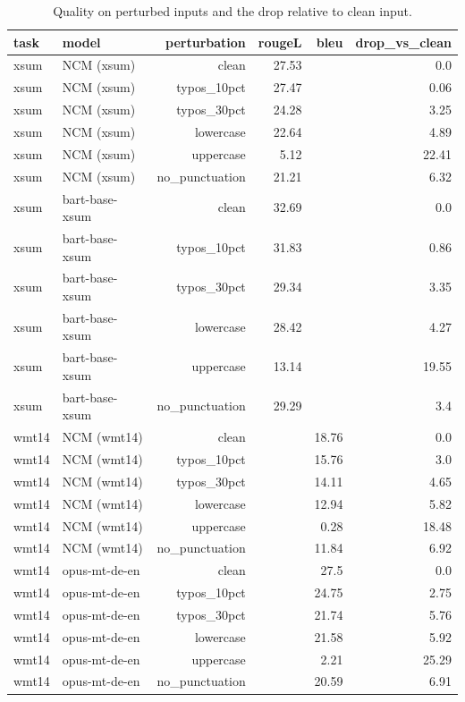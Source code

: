 \begin{table}[t]
\centering\small
\caption{Quality on perturbed inputs and the drop relative to clean input.}
\label{tab:robustness}
\begin{tabular}{llrrrr}
\toprule
task & model & perturbation & rougeL & bleu & drop\_vs\_clean \\
\midrule
xsum & NCM (xsum) & clean & 27.53 &  & 0.0 \\
xsum & NCM (xsum) & typos\_10pct & 27.47 &  & 0.06 \\
xsum & NCM (xsum) & typos\_30pct & 24.28 &  & 3.25 \\
xsum & NCM (xsum) & lowercase & 22.64 &  & 4.89 \\
xsum & NCM (xsum) & uppercase & 5.12 &  & 22.41 \\
xsum & NCM (xsum) & no\_punctuation & 21.21 &  & 6.32 \\
xsum & bart-base-xsum & clean & 32.69 &  & 0.0 \\
xsum & bart-base-xsum & typos\_10pct & 31.83 &  & 0.86 \\
xsum & bart-base-xsum & typos\_30pct & 29.34 &  & 3.35 \\
xsum & bart-base-xsum & lowercase & 28.42 &  & 4.27 \\
xsum & bart-base-xsum & uppercase & 13.14 &  & 19.55 \\
xsum & bart-base-xsum & no\_punctuation & 29.29 &  & 3.4 \\
wmt14 & NCM (wmt14) & clean &  & 18.76 & 0.0 \\
wmt14 & NCM (wmt14) & typos\_10pct &  & 15.76 & 3.0 \\
wmt14 & NCM (wmt14) & typos\_30pct &  & 14.11 & 4.65 \\
wmt14 & NCM (wmt14) & lowercase &  & 12.94 & 5.82 \\
wmt14 & NCM (wmt14) & uppercase &  & 0.28 & 18.48 \\
wmt14 & NCM (wmt14) & no\_punctuation &  & 11.84 & 6.92 \\
wmt14 & opus-mt-de-en & clean &  & 27.5 & 0.0 \\
wmt14 & opus-mt-de-en & typos\_10pct &  & 24.75 & 2.75 \\
wmt14 & opus-mt-de-en & typos\_30pct &  & 21.74 & 5.76 \\
wmt14 & opus-mt-de-en & lowercase &  & 21.58 & 5.92 \\
wmt14 & opus-mt-de-en & uppercase &  & 2.21 & 25.29 \\
wmt14 & opus-mt-de-en & no\_punctuation &  & 20.59 & 6.91 \\
\bottomrule
\end{tabular}
\end{table}
